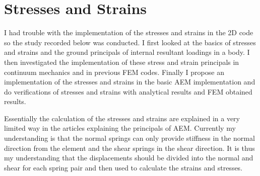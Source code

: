 \section{Stresses and Strains}

I had trouble with the implementation of the stresses and strains in the 2D code so the study recorded below was conducted.  I first looked at the basics of stresses and strains and the ground principals of internal resultant loadings in a body.  I then investigated the implementation of these stress and strain principals in continuum mechanics and in previous FEM codes.  Finally I propose an implementation of the stresses and strains in the basic AEM implementation and do verifications of stresses and strains with analytical results and FEM obtained results. 

Essentially the calculation of the stresses and strains are explained in a very limited way in the articles explaining the principals of AEM.  Currently my understanding is that the normal springs can only provide stiffness in the normal direction from the element and the shear springs in the shear direction.  It is thus my understanding that the displacements should be divided into the normal and shear for each spring pair and then used to calculate the strains and stresses.  

